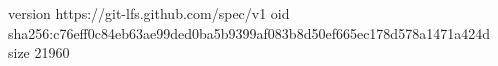 version https://git-lfs.github.com/spec/v1
oid sha256:c76eff0c84eb63ae99ded0ba5b9399af083b8d50ef665ec178d578a1471a424d
size 21960
